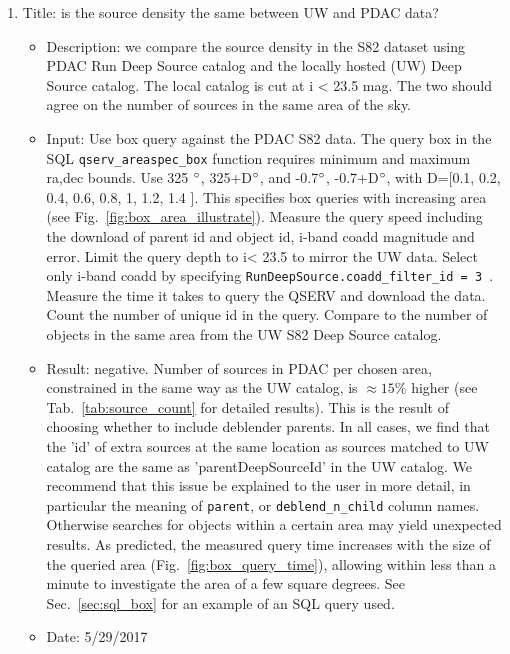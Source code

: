 \documentclass[DM,lsstdraft,toc,usenatbib]{lsstdoc}
\begin{document}
\begin{enumerate}
  \item Title: is the source density the same between UW and PDAC data?  
  \begin{itemize}
    \item Description: we compare the source density in the S82 dataset using PDAC Run Deep Source catalog and the locally hosted (UW) Deep Source catalog. The local catalog is cut at i < 23.5 mag.  The two should agree on the number of sources in the same area of the sky.
    \item Input: Use box query against the PDAC S82 data. The query box in the SQL \verb|qserv_areaspec_box| function requires minimum and maximum ra,dec bounds.  Use 325 $\degree$, 325+D$\degree$, and -0.7$\degree$, -0.7+D$\degree$, with D=[0.1, 0.2, 0.4, 0.6, 0.8, 1, 1.2, 1.4 ]. This specifies box queries with increasing area (see Fig.~\ref{fig:box_area_illustrate}). Measure the query speed including the download of  parent id and object id,  i-band coadd magnitude and error. Limit the query depth to i< 23.5 to mirror the UW data. Select only i-band coadd by specifying \verb|RunDeepSource.coadd_filter_id = 3 |. Measure the time it takes to query the QSERV and download the data. Count the number of unique id in the query. Compare to the number of objects in the same area from the UW S82 Deep Source catalog. 
    \item Result: negative. Number of sources in PDAC per chosen area, constrained in the same way as the UW catalog, is $\approx15\% $ higher (see Tab.~\ref{tab:source_count} for detailed results). This is the result of choosing whether to include deblender parents. In all cases, we find that the 'id' of extra sources at the same location as sources matched to UW catalog are the same as 'parentDeepSourceId' in the UW catalog.   We recommend that this issue  be explained to the user in more detail, in particular the meaning of  \verb|parent|, or \verb|deblend_n_child| column names. Otherwise searches for objects within a certain area may yield unexpected results.  As predicted, the measured query  time increases with the size of the queried area (Fig.~\ref{fig:box_query_time}), allowing within less than a minute to investigate the area of a few square degrees. See Sec.~\ref{sec:sql_box} for an example of an SQL query used. 
    \item Date: 5/29/2017
    \end{itemize}
\end{enumerate}
\end{document}
